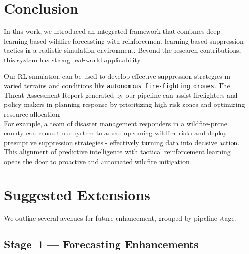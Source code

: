 \documentclass[conference]{IEEEtran}
\begin{document}

\section{Conclusion}
In this work, we introduced an integrated framework that combines deep learning-based wildfire forecasting with reinforcement learning-based suppression tactics in a realistic simulation environment. Beyond the research contributions, this system has strong real-world applicability.

Our RL simulation can be used to develop effective suppression strategies in varied terrains and conditions like \texttt{autonomous fire-fighting drones}. The Threat Assessment Report generated by our pipeline can assist firefighters and policy-makers in planning response by prioritizing high-risk zones and optimizing resource allocation.\\
For example, a team of disaster management responders in a wildfire-prone county can consult our system to assess upcoming wildfire risks and deploy preemptive suppression strategies - effectively turning data into decisive action. This alignment of predictive intelligence with tactical reinforcement learning opens the door to proactive and automated wildfire mitigation.

\section{Suggested Extensions}

We outline several avenues for future enhancement, grouped by pipeline stage.

\subsection{Stage~1 — Forecasting Enhancements}

\end{document}
